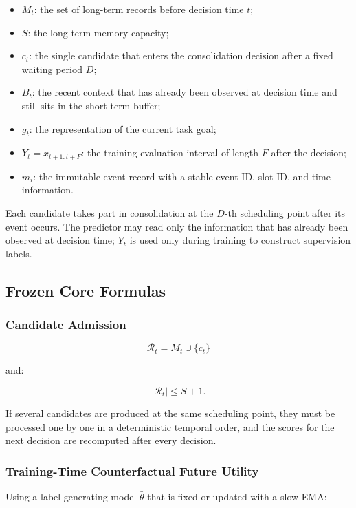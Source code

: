 \begin{itemize}
  \item $M_t$: the set of long-term records before decision time $t$;
  \item $S$: the long-term memory capacity;
  \item $c_t$: the single candidate that enters the consolidation decision after a fixed waiting period $D$;
  \item $B_t$: the recent context that has already been observed at decision time and still sits in the short-term buffer;
  \item $g_t$: the representation of the current task goal;
  \item $Y_t=x_{t+1:t+F}$: the training evaluation interval of length $F$ after the decision;
  \item $m_i$: the immutable event record with a stable event ID, slot ID, and time information.
\end{itemize}

Each candidate takes part in consolidation at the $D$-th scheduling point after its event occurs. The predictor may read only the information that has already been observed at decision time; $Y_t$ is used only during training to construct supervision labels.

\subsection{Frozen Core Formulas}

\subsubsection{Candidate Admission}

\[
\boxed{
\mathcal R_t=M_t\cup\{ c_t\}
}
\]

and:

\[
|\mathcal R_t|\le S+1.
\]

If several candidates are produced at the same scheduling point, they must be processed one by one in a deterministic temporal order, and the scores for the next decision are recomputed after every decision.

\subsubsection{Training-Time Counterfactual Future Utility}

Using a label-generating model $\bar\theta$ that is fixed or updated with a slow EMA:

